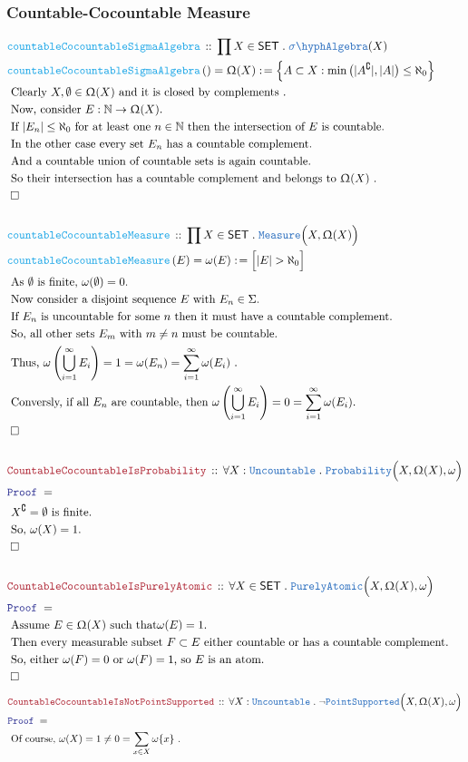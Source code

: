 \documentclass[12pt]{scrartcl}
\newcommand{\TYPE}[1]{\textcolor{NavyBlue}{\mathtt{#1}}}
\newcommand{\FUNC}[1]{\textcolor{Cerulean}{\mathtt{#1}}}
\newcommand{\LOGIC}[1]{\textcolor{Blue}{\mathtt{#1}}}
\newcommand{\THM}[1]{\textcolor{Maroon}{\mathtt{#1}}}
\renewcommand{\.}{\; . \;}
\newcommand{\de}{: \kern 0.1pc =}
\newcommand{\Act}[1]{\left( #1 \right)}
\newcommand{\Theorem}[2]{& \THM{#1} \, :: \, #2 \\ & \Proof = \\ }
\newcommand{\DeclareFunc}[2]{& \FUNC{#1} \, :: \, #2 \\}
\newcommand{\DefineNamedFunc}[4]{&  \FUNC{#1}\Act{#2} = #3 \de #4 \\}
\newcommand{\Page}[1]{ \begin{align*} #1 \end{align*}   }
\newcommand{\Nat}{\mathbb{N} }
\renewcommand{\c}{\complement}
\newcommand{\QED}{\; \square}
\newcommand{\EndProof}{& \QED \\}
\newcommand{\Proof}{\LOGIC{Proof} \; }
\newcommand{\Explain}[1]{& \text{#1.} \\}
\newcommand{\Uncountable}{\TYPE{Uncountable}}
\newcommand{\SA}{\TYPE{\sigma \hyph Algebra}}
\newcommand{\SET}{\mathsf{SET}}
\newcommand{\PA}{\TYPE{PurelyAtomic}}
\newcommand{\Measure}{\TYPE{Measure}}
\newcommand{\Probability}{\TYPE{Probability}}
\newcommand{\PtSupp}{\TYPE{PointSupported}}
\begin{document}
\subsubsection{Countable-Cocountable Measure}
\Page{
	\DeclareFunc{countableCocountableSigmaAlgebra}
	{
		\prod X \in \SET \. \SA(X)
	}
	\DefineNamedFunc{countableCocountableSigmaAlgebra}{}{
		\Upomega(X)
	}
	{
		\Big\{ A \subset X : \min\big(|A^\c|,|A|\big) \le \aleph_0 \Big\} 	
	}
	\Explain{
		Clearly $X,\emptyset \in \Upomega(X)$ and it is closed by complements 
	}
	\Explain{
		Now, consider $E : \Nat \to \Upomega(X)$}
	\Explain{
		If  $|E_n| \le \aleph_0$ for at  least one $n \in \Nat$
		then the intersection of $E$ is countable}
	\Explain{
		In the other case every set $E_n$ has a countable complement}
	\Explain{
		And a countable union of countable sets is again countable}
	\Explain{
		So their intersection has a countable complement and belongs to $\Upomega(X)$
	}
	\EndProof	
	\\
	\DeclareFunc{countableCocountableMeasure}
	{
		\prod X \in \SET \. \Measure\Big(X,\Upomega(X)\Big)
	}
	\DefineNamedFunc{countableCocountableMeasure}{E}{\omega(E)}{\Big[ |E| > \aleph_0 \Big]}
	\Explain{
		As $\emptyset$ is finite, $\omega(\emptyset) = 0$}
	\Explain{
		Now consider a disjoint sequence $E$ with $E_n \in \Sigma$}
	\Explain{
		If $E_n$ is uncountable for some $n$ then it must have a countable complement}
	\Explain{
		So, all other sets $E_m$ with $m \neq n$ must be countable}
	\Explain{
		Thus, $\omega\left(\bigcup^\infty_{i=1} E_i \right) =1 = \omega(E_n) = \sum^\infty_{i=1} \omega(E_i)$
	}
	\Explain{
		Conversly, if all $E_n$ are countable, then
		$
			\omega\left(\bigcup^\infty_{i=1} E_i \right) = 0 = \sum^\infty_{i=1} \omega(E_i)
		$}
	\EndProof
	\\
	\Theorem{CountableCocountableIsProbability}{\forall X : \Uncountable \. \Probability\Big(X,\Upomega(X),\omega\Big)}
	\Explain{
		$X^\c = \emptyset$ is finite}
	\Explain{
		So, $\omega(X) = 1$}
	\EndProof
	\\
	\Theorem{CountableCocountableIsPurelyAtomic}
	{ \forall X \in \SET \. \PA\Big(X,\Upomega(X),\omega\Big)}
	\Explain{
		Assume $E \in \Upomega(X)$ such that$\omega(E) = 1$}
	\Explain{
		Then every measurable subset $F \subset E$ either countable or has a countable complement}
	\Explain{
		So, either $\omega(F) = 0$ or $\omega(F)=1$, so $E$ is an atom}
	\EndProof
}\Page{
	\Theorem{CountableCocountableIsNotPointSupported}
	{
		\forall X : \Uncountable \. \neg \PtSupp\Big(X,\Upomega(X),\omega\Big)
	}
	\Explain{
		Of course,  $\omega(X) = 1 \neq 0 = \sum_{x \in X} \omega\{x\}$
}}
\end{document}
